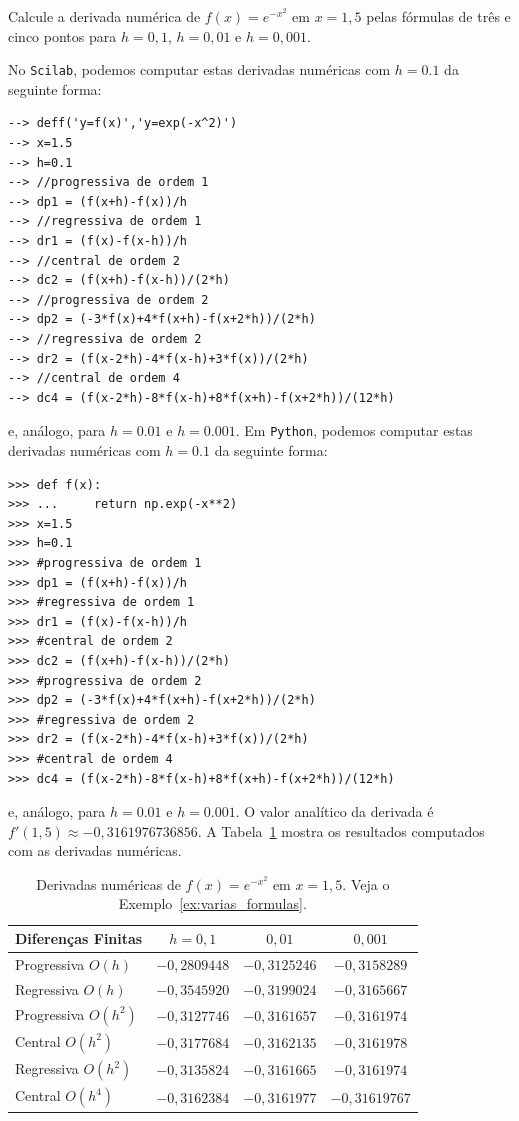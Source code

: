 \begin{ex}\label{ex:varias_formulas}
Calcule a derivada numérica de $f(x)=e^{-x^2}$ em $x=1,5$ pelas fórmulas de três e cinco pontos para $h=0,1$, $h=0,01$ e $h=0,001$.
\end{ex}
\begin{sol}
\ifisscilab
No \verb+Scilab+, podemos computar estas derivadas numéricas com $h=0.1$ da seguinte forma:
\begin{verbatim}
--> deff('y=f(x)','y=exp(-x^2)')
--> x=1.5
--> h=0.1
--> //progressiva de ordem 1
--> dp1 = (f(x+h)-f(x))/h
--> //regressiva de ordem 1
--> dr1 = (f(x)-f(x-h))/h
--> //central de ordem 2
--> dc2 = (f(x+h)-f(x-h))/(2*h)
--> //progressiva de ordem 2
--> dp2 = (-3*f(x)+4*f(x+h)-f(x+2*h))/(2*h)
--> //regressiva de ordem 2
--> dr2 = (f(x-2*h)-4*f(x-h)+3*f(x))/(2*h)
--> //central de ordem 4
--> dc4 = (f(x-2*h)-8*f(x-h)+8*f(x+h)-f(x+2*h))/(12*h)
\end{verbatim}
e, análogo, para $h=0.01$ e $h=0.001$.
\fi
\ifispython
Em \verb+Python+, podemos computar estas derivadas numéricas com $h=0.1$ da seguinte forma:
\begin{verbatim}
>>> def f(x):
>>> ...     return np.exp(-x**2)
>>> x=1.5
>>> h=0.1
>>> #progressiva de ordem 1
>>> dp1 = (f(x+h)-f(x))/h
>>> #regressiva de ordem 1
>>> dr1 = (f(x)-f(x-h))/h
>>> #central de ordem 2
>>> dc2 = (f(x+h)-f(x-h))/(2*h)
>>> #progressiva de ordem 2
>>> dp2 = (-3*f(x)+4*f(x+h)-f(x+2*h))/(2*h)
>>> #regressiva de ordem 2
>>> dr2 = (f(x-2*h)-4*f(x-h)+3*f(x))/(2*h)
>>> #central de ordem 4
>>> dc4 = (f(x-2*h)-8*f(x-h)+8*f(x+h)-f(x+2*h))/(12*h)
\end{verbatim}
e, análogo, para $h=0.01$ e $h=0.001$.
\fi
O valor analítico da derivada é $f'(1,5) \approx -0,3161976736856$. A Tabela~\ref{tab:ex_varias_formulas} mostra os resultados computados com as derivadas numéricas.

\begin{table}
  \centering
  \begin{tabular}{l|ccc}
    Diferenças Finitas & $h=0,1$ & $0,01$ & $0,001$\\\hline
    Progressiva $O(h)$ & $-0,2809448$ & $-0,3125246$ & $-0,3158289$\\
    Regressiva $O(h)$ & $-0,3545920$ & $-0,3199024$ & $-0,3165667$\\
    Progressiva $O(h^2)$ & $-0,3127746$ & $-0,3161657$ & $-0,3161974$\\
    Central $O(h^2)$ & $-0,3177684$ & $-0,3162135$ & $-0,3161978$ \\
    Regressiva $O(h^2)$ & $-0,3135824$ & $-0,3161665$ & $-0,3161974$\\
    Central $O(h^4)$ & $-0,3162384$ & $-0,3161977$ & $-0,31619767$ \\\hline
  \end{tabular}
  \caption{Derivadas numéricas de $f(x) = e^{-x^ 2}$ em $x=1,5$. Veja o Exemplo~\ref{ex:varias_formulas}.}
  \label{tab:ex_varias_formulas}
\end{table}
\end{sol}

